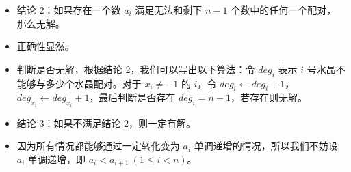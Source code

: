 \documentclass[10pt,aspectratio=43,mathserif]{beamer}
\begin{document}
\begin{frame}

	\begin{itemize} \setlength{\parskip}{0.4\baselineskip}

		\item 结论 2：如果存在一个数 $a_i$ 满足无法和剩下 $n-1$ 个数中的任何一个配对，那么无解。

		\item 正确性显然。

		\item 判断是否无解，根据结论 2，我们可以写出以下算法：令 $deg_i$ 表示 $i$ 号水晶不能够与多少个水晶配对。对于 $x_i \neq -1$ 的 $i$，令 $deg_i\gets deg_i+1$，$deg_{x_i}\gets deg_{x_i}+1$，最后判断是否存在 $deg_i=n-1$，若存在则无解。

	\end{itemize}

\end{frame}

\begin{frame}

	\begin{itemize} \setlength{\parskip}{0.4\baselineskip}

		\item 结论 3：如果不满足结论 2，则一定有解。

		\item 因为所有情况都能够通过一定转化变为 $a_i$ 单调递增的情况，所以我们不妨设 $a_i$ 单调递增，即 $a_i<a_{i+1}\ (1\leq i<n)$。

	\end{itemize}

\end{frame}
\end{document}
